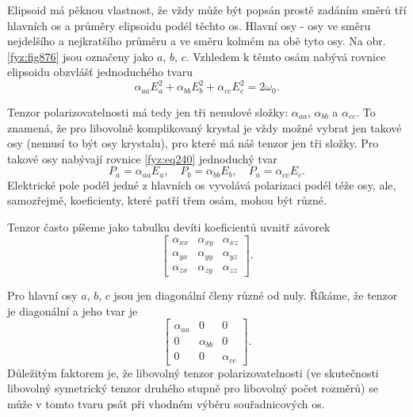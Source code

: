     Elipsoid má pěknou vlastnost, že vždy může být popsán prostě zadáním směrů tří hlavních os a
    průměry elipsoidu podél těchto os. Hlavní osy - osy ve směru nejdelšího a nejkratšího průměru a
    ve směru kolmém na obě tyto osy. Na obr. \ref{fyz:fig876} jsou označeny jako \(a\), \(b\),
    \(c\). Vzhledem k těmto osám nabývá rovnice elipsoidu obzvlášť jednoduchého tvaru
    \begin{equation*}
      \alpha_{aa}E_a^2 + \alpha_{bb}E_b^2 + \alpha_{cc}E_c^2= 2\omega_0.
    \end{equation*}

    Tenzor polarizovatelnosti má tedy jen tři nenulové složky: \(\alpha_{aa}\), \(\alpha_{bb}\) a
    \(\alpha_{cc}\). To znamená, že pro libovolně komplikovaný krystal je vždy možné vybrat jen
    takové osy (nemusí to být osy krystalu), pro které má náš tenzor jen tři složky. Pro takové osy
    nabývají rovnice \eqref{fyz:eq240} jednoduchý tvar
    \begin{equation}\label{fyz:eq832}
      P_a = \alpha_{aa}E_a,\quad P_b = \alpha_{bb}E_b,\quad P_a = \alpha_{cc}E_c.
    \end{equation}
    Elektrické pole podél jedné z hlavních os vyvolává polarizaci podél téže osy, ale, samozřejmě,
    koeficienty, které patří třem osám, mohou být různé.

    Tenzor často píšeme jako tabulku devíti koeficientů uvnitř závorek
    \begin{equation}\label{fyz:eq833}
      \begin{bmatrix}
        \alpha_{xx}& \alpha_{xy}& \alpha_{xz} \\
        \alpha_{yx}& \alpha_{yy}& \alpha_{yz} \\
        \alpha_{zx}& \alpha_{zy}& \alpha_{zz}
      \end{bmatrix}.
    \end{equation}

    Pro hlavní osy \(a\), \(b\), \(c\) jsou jen diagonální členy různé od nuly. Říkáme, že tenzor je
    diagonální a jeho tvar je
    \begin{equation}\label{fyz:eq834}
      \begin{bmatrix}
        \alpha_{aa}&      0      &      0      \\
             0     & \alpha_{bb} &      0      \\
             0     &      0      & \alpha_{cc}
      \end{bmatrix}.
    \end{equation}
    Důležitým faktorem je, že libovolný tenzor polarizovatelnosti (ve skutečnosti libovolný
    symetrický tenzor druhého stupně pro libovolný počet rozměrů) se může v tomto tvaru psát při
    vhodném výběru souřadnicových os.
    
